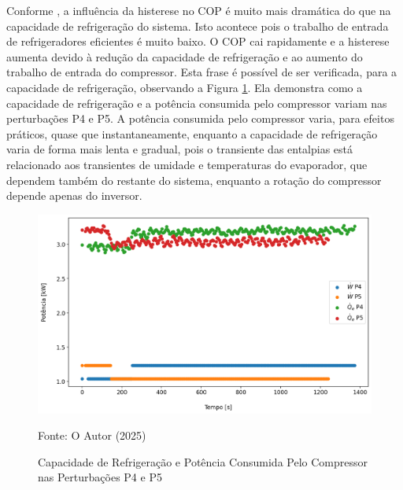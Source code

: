 Conforme \textcite{MASCHE2021302}, a influência da histerese no COP é muito mais dramática do que na capacidade de refrigeração do sistema. Isto acontece pois o trabalho de entrada de refrigeradores eficientes é muito baixo. O COP cai rapidamente e a histerese aumenta devido à redução da capacidade de refrigeração e ao aumento do trabalho de entrada do compressor. Esta frase é possível de ser verificada, para a capacidade de refrigeração, observando a Figura \ref{fig:Capacidade de Resfriamento e Potência de Entrada do Compressor P4 e P5}. Ela demonstra como a capacidade de refrigeração e a potência consumida pelo compressor variam nas perturbações P4 e P5. A potência consumida pelo compressor varia, para efeitos práticos, quase que instantaneamente, enquanto a capacidade de refrigeração varia de forma mais lenta e gradual, pois o transiente das entalpias está relacionado aos transientes de umidade e temperaturas do evaporador, que dependem também do restante do sistema, enquanto a rotação do compressor depende apenas do inversor.
\newpage
\begin{figure}[h]
    \centering
    \includegraphics[width=1\linewidth]{FigurasdoTexto/Qe e W Histerese.png}
    \caption{Capacidade de Refrigeração e Potência Consumida Pelo Compressor nas Perturbações P4 e P5}
    \label{fig:Capacidade de Resfriamento e Potência de Entrada do Compressor P4 e P5}
    {\footnotesize Fonte: O Autor (2025)}
\end{figure}

